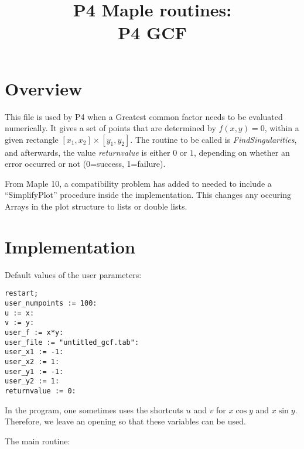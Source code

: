 \documentclass[a4paper,10pt]{article}
\title{P4 Maple routines:\\P4 GCF}
\author{}
\date{}
\begin{document}
\maketitle

\section{Overview}

This file is used by P4 when a Greatest common factor needs to be evaluated numerically.
It gives a set of points that are determined by $f(x,y)=0$, within a given rectangle $[x_1,x_2]\times[y_1,y_2]$.
The routine to be called is \emph{FindSingularities}, and afterwards, the value \emph{returnvalue} is either
$0$ or $1$, depending on whether an error occurred or not (0=success, 1=failure).


From Maple 10, a compatibility problem has added to needed to include a ``SimplifyPlot'' procedure inside the implementation.
This changes any occuring Arrays in the plot structure to lists or double lists.

\section{Implementation}

Default values of the user parameters:

\begin{lstlisting}[name=p4gcf]
restart;
user_numpoints := 100:
u := x:
v := y:
user_f := x*y:
user_file := "untitled_gcf.tab":
user_x1 := -1:
user_x2 := 1:
user_y1 := -1:
user_y2 := 1:
returnvalue := 0:
\end{lstlisting}

In the program, one sometimes uses the shortcuts $u$ and $v$ for $x\cos y$ and $x\sin y$.  Therefore,
we leave an opening so that these variables can be used.

The main routine:
\end{document}
